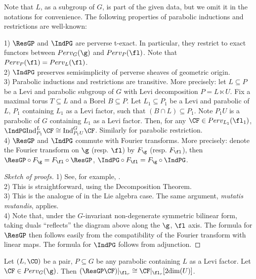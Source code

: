 Note that $L$, as a subgroup of $G$, is part of the given data, but we omit it in the notations for convenience. The following properties of parabolic inductions and restrictions are well-known:

\begin{lemma}\label{lem_Res_Ind_basics}
    1) $\ResGP$ and $\IndPG$ are perverse t-exact. In particular, they restrict to exact functors between $Perv_G(\g)$ and $Perv_P(\fl)$. Note that $Perv_P(\fl)=Perv_L(\fl)$.\\
    2) $\IndPG$ preserves semisimplicity of perverse sheaves of geometric origin.\\
    3) Parabolic inductions and restrictions are transitive. More precisely: let $L\subseteq P$ be a Levi and parabolic subgroup of $G$ with Levi decomposition $P=L\ltimes U$. Fix a maximal torus $T\subseteq L$ and a Borel $B\subseteq P$. Let $L_1\subseteq P_1$ be a Levi and parabolic of $L$, $P_1$ containing $L_1$ as a Levi factor, such that $(B\cap L)\subseteq P_1$. Note $P_1U$ is a parabolic of $G$ containing $L_1$ as a Levi factor. Then, for any $\CF\in Perv_{L_1}(\fl_1)$,  $\IndPG\mathrm{Ind}^L_{P_1}\CF\cong \mathrm{Ind}^G_{P_1U}\CF$. Similarly for parabolic restriction.\\
    4) $\ResGP$ and $\IndPG$ commute with Fourier transforms. More precisely: denote the Fourier transform on $\g$ (resp. $\fl$) by $F_\g$ (resp. $F_\fl$), then $\ResGP\circ F_\g=F_\fl\circ\ResGP$, $\IndPG\circ F_\fl=F_\g\circ\IndPG$.
\end{lemma}

\begin{proof}[Sketch of proofs]
    1) See, for example, \cite[]{bezrukavnikov_parabolic_2021}.\\ 2) This is straightforward, using the Decomposition Theorem.\\
    3) This is the analogue of \cite[]{lusztig_character_1985} in the Lie algebra case. The same argument, \textit{mutatis mutandis}, applies.\\
    4) Note that, under the $G$-invariant non-degenerate symmetric bilinear form, taking duals “reflects” the diagram above along the $\g$, $\fl$ axis. The formula for $\ResGP$ then follows easily from the compatibility of the Fourier transform with linear maps. The formula for $\IndPG$ follows from adjunction.

\end{proof}

\begin{lemma}\label{lem_res=Res}
    Let $(L,\CO)$ be a pair, $P\subseteq G$ be any parabolic containing $L$ as a Levi factor. Let $\CF\in Perv_G(\g)$. Then $(\ResGP\CF)|_{\fl_r}\cong \CF|_{\fl_r}[2\mathrm{dim}(U)]$.
\end{lemma}

